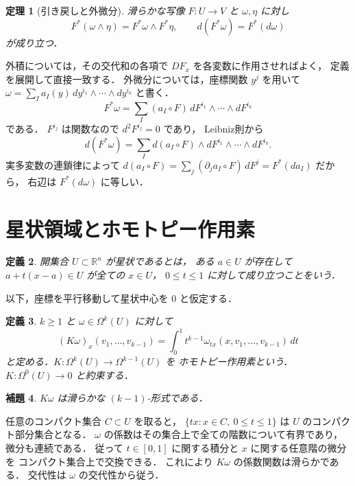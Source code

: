 \documentclass[a5paper,10pt,onecolumn]{jsarticle}
\makeatletter
\theoremstyle{mathnotetheorem}
\newtheorem{theorem}{定理}[section]
\newtheorem{definition}[theorem]{定義}
\newtheorem{lemma}[theorem]{補題}
\renewcommand{\proofname}{証明}
\renewenvironment{proof}[1][\proofname]{%
  \par\pushQED{\qed}\normalfont\topsep4\p@\@plus2\p@\relax
  \trivlist\item[\hskip\labelsep\bfseries #1]\ignorespaces
}{\popQED\endtrivlist\@endpefalse}
\makeatother
\begin{document}
\begin{theorem}[引き戻しと外微分]\label{thm:pullback}
滑らかな写像 $F:U\to V$ と
$\omega,\eta$ に対し
\[
 F^*(\omega\wedge\eta)=F^*\omega\wedge F^*\eta,
 \qquad
 d(F^*\omega)=F^*(d\omega)
\]
が成り立つ．
\end{theorem}
\begin{proof}
外積については，その交代和の各項で
$DF_x$ を各変数に作用させればよく，
定義を展開して直接一致する．
外微分については，座標関数 $y^j$ を用いて
$\omega=\sum_I a_I(y)\,dy^{i_1}\wedge\cdots\wedge dy^{i_k}$
と書く．
\[
 F^*\omega=\sum_I(a_I\circ F)\,
 dF^{i_1}\wedge\cdots\wedge dF^{i_k}
\]
である．
$F^{i_j}$ は関数なので $d^2F^{i_j}=0$ であり，
Leibniz則から
\[
 d(F^*\omega)=
 \sum_I d(a_I\circ F)\wedge
 dF^{i_1}\wedge\cdots\wedge dF^{i_k}.
\]
実多変数の連鎖律によって
$d(a_I\circ F)=\sum_j(\partial_ja_I\circ F)\,dF^j
=F^*(da_I)$ だから，
右辺は $F^*(d\omega)$ に等しい．
\end{proof}

\section{星状領域とホモトピー作用素}

\begin{definition}
開集合 $U\subset\mathbb R^n$ が\emph{星状}であるとは，
ある $a\in U$ が存在して
$a+t(x-a)\in U$ が全ての $x\in U$，
$0\le t\le1$ に対して成り立つことをいう．
\end{definition}

以下，座標を平行移動して星状中心を $0$ と仮定する．
\begin{definition}
$k\ge1$ と $\omega\in\Omega^k(U)$ に対して
\[
 (K\omega)_x(v_1,\dots,v_{k-1})
 =\int_0^1t^{k-1}
 \omega_{tx}(x,v_1,\dots,v_{k-1})\,dt
\]
と定める．$K:\Omega^k(U)\to\Omega^{k-1}(U)$ を
\emph{ホモトピー作用素}という．
$K:\Omega^0(U)\to0$ と約束する．
\end{definition}

\begin{lemma}\label{lem:k-smooth}
$K\omega$ は滑らかな $(k-1)$-形式である．
\end{lemma}
\begin{proof}
任意のコンパクト集合 $C\subset U$ を取ると，
$\{tx:x\in C,\ 0\le t\le1\}$ は $U$ のコンパクト部分集合となる．
$\omega$ の係数はその集合上で全ての階数について有界であり，
微分も連続である．
従って $t\in[0,1]$ に関する積分と
$x$ に関する任意階の微分を
コンパクト集合上で交換できる．
これにより $K\omega$ の係数関数は滑らかである．
交代性は $\omega$ の交代性から従う．
\end{proof}
\end{document}
